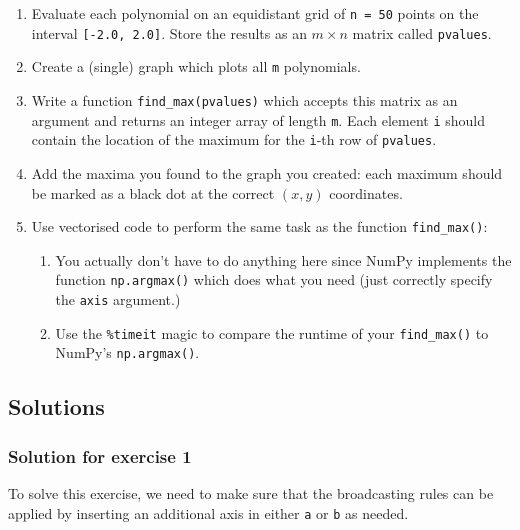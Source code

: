 \documentclass[10pt]{scrartcl}
\providecommand{\tightlist}{%
      \setlength{\itemsep}{0pt}\setlength{\parskip}{0pt}}
\begin{document}
\begin{enumerate}
\def\labelenumi{\arabic{enumi}.}
\tightlist
\item
  Evaluate each polynomial on an equidistant grid of \texttt{n\ =\ 50}
  points on the interval \texttt{{[}-2.0,\ 2.0{]}}. Store the results as
  an \(m \times n\) matrix called \texttt{pvalues}.
\item
  Create a (single) graph which plots all \texttt{m} polynomials.
\item
  Write a function \texttt{find\_max(pvalues)} which accepts this matrix
  as an argument and returns an integer array of length \texttt{m}. Each
  element \texttt{i} should contain the location of the maximum for the
  \texttt{i}-th row of \texttt{pvalues}.
\item
  Add the maxima you found to the graph you created: each maximum should
  be marked as a black dot at the correct \((x,y)\) coordinates.
\item
  Use vectorised code to perform the same task as the function
  \texttt{find\_max()}:

  \begin{enumerate}
  \def\labelenumii{\arabic{enumii}.}
  \tightlist
  \item
    You actually don't have to do anything here since NumPy implements
    the function \texttt{np.argmax()} which does what you need (just
    correctly specify the \texttt{axis} argument.)
  \item
    Use the \texttt{\%timeit} magic to compare the runtime of your
    \texttt{find\_max()} to NumPy's \texttt{np.argmax()}.
  \end{enumerate}
\end{enumerate}


\hypertarget{solutions}{%
\subsection{Solutions}\label{solutions}}

    \hypertarget{solution-for-exercise-1}{%
\subsubsection{Solution for exercise 1}\label{solution-for-exercise-1}}

To solve this exercise, we need to make sure that the broadcasting rules
can be applied by inserting an additional axis in either \texttt{a} or
\texttt{b} as needed.
\end{document}
